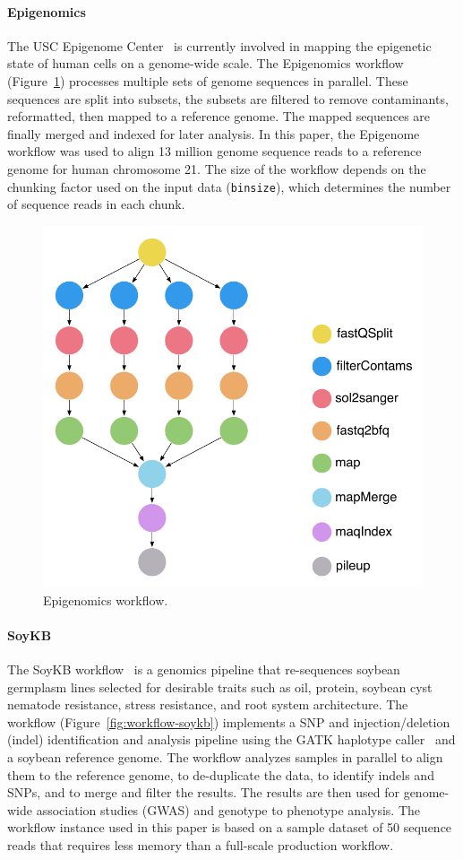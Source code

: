 \documentclass[final,5p,times,twocolumn]{elsarticle}
\begin{document}
\paragraph{\textbf{Epigenomics}}
The USC Epigenome Center~\cite{genome} is currently involved in mapping the epigenetic 
state of human cells on a genome-wide scale. The Epigenomics workflow 
(Figure~\ref{fig:workflow-genome}) processes multiple sets of genome sequences in
parallel. These sequences are split into subsets, the subsets are filtered to remove
contaminants, reformatted, then mapped to a reference genome. The mapped sequences are
finally merged and indexed for later analysis. In this paper, the Epigenome
workflow was used to align 13 million genome sequence reads to a reference genome
for human chromosome 21. The size of the workflow depends on the 
chunking factor used on the input data (\texttt{binsize}), which determines
the number of sequence reads in each chunk.

\begin{figure}[!htb]
	\centering
	\includegraphics[width=0.75\linewidth]{figures/workflow-genome}
	\caption{Epigenomics workflow.}
	\label{fig:workflow-genome}
\end{figure}

\paragraph{\textbf{SoyKB}}
The SoyKB workflow~\cite{soybean, Joshi01012014} is a genomics pipeline 
that re-sequences soybean germplasm lines selected for desirable traits such 
as oil, protein, soybean cyst nematode resistance, stress resistance, and root 
system architecture. The workflow (Figure~\ref{fig:workflow-soykb}) 
implements a SNP and injection/deletion (indel) identification and analysis 
pipeline using the GATK haplotype caller~\cite{gatk} and a soybean reference 
genome. The workflow analyzes samples in parallel to align them to the reference 
genome, to de-duplicate the data, to identify indels and SNPs, and to merge and 
filter the results. The results are then used for genome-wide association studies 
(GWAS) and genotype to phenotype analysis. The workflow instance used in this 
paper is based on a sample dataset of 50 sequence reads that requires less 
memory than a full-scale production workflow.
\end{document}
